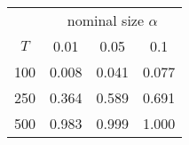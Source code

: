 % 
\begin{tabular}{cccc}
  \hline
  & \multicolumn{3}{c}{nominal size $\alpha$} \\
 $T$ & 0.01 & 0.05 & 0.1 \\
 \hline
100 & 0.008 & 0.041 & 0.077 \\ 
  250 & 0.364 & 0.589 & 0.691 \\ 
  500 & 0.983 & 0.999 & 1.000 \\ 
   \hline
\end{tabular}
